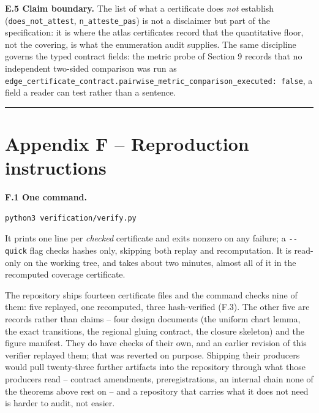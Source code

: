 \textbf{E.5 Claim boundary.} The list of what a certificate does \emph{not} establish (\texttt{does\_\allowbreak{}not\_\allowbreak{}attest}, \texttt{n\_\allowbreak{}atteste\_\allowbreak{}pas}) is not a disclaimer but part of the specification: it is where the atlas certificates record that the quantitative floor, not the covering, is what the enumeration audit supplies. The same discipline governs the typed contract fields: the metric probe of Section 9 records that no independent two-sided comparison was run as \texttt{edge\_\allowbreak{}certificate\_\allowbreak{}contract.\allowbreak{}pairwise\_\allowbreak{}metric\_\allowbreak{}comparison\_\allowbreak{}executed:\ false}, a field a reader can test rather than a sentence.

\begin{center}\rule{\linewidth}{0.5pt}\end{center}

\section{Appendix F -- Reproduction instructions}\label{appendix-f-reproduction-instructions}

\textbf{F.1 One command.}

\begin{verbatim}
python3 verification/verify.py
\end{verbatim}

It prints one line per \emph{checked} certificate and exits nonzero on any failure; a \texttt{-\allowbreak{}\/\allowbreak{}-\allowbreak{}quick} flag checks hashes only, skipping both replay and recomputation. It is read-only on the working tree, and takes about two minutes, almost all of it in the recomputed coverage certificate.

The repository ships fourteen certificate files and the command checks nine of them: five replayed, one recomputed, three hash-verified (F.3). The other five are records rather than claims -- four design documents (the uniform chart lemma, the exact transitions, the regional gluing contract, the closure skeleton) and the figure manifest. They do have checks of their own, and an earlier revision of this verifier replayed them; that was reverted on purpose. Shipping their producers would pull twenty-three further artifacts into the repository through what those producers read -- contract amendments, preregistrations, an internal chain none of the theorems above rest on -- and a repository that carries what it does not need is harder to audit, not easier.

